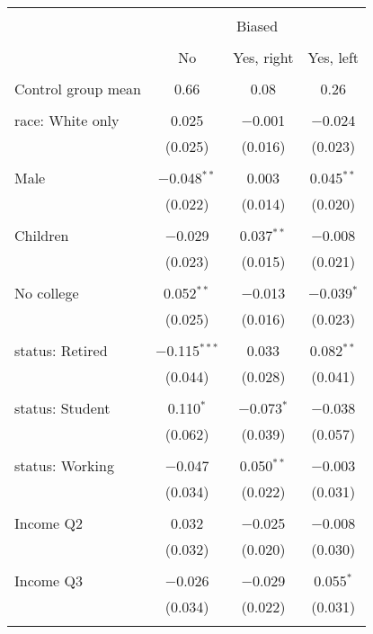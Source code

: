 
\begin{tabular}{@{\extracolsep{5pt}}lccc} 
\\[-1.8ex]\hline 
\hline \\[-1.8ex] 
 & \multicolumn{3}{c}{Biased} \\ 
\cline{2-4} 
\\[-1.8ex] & No & Yes, right & Yes, left \\ 
\hline \\[-1.8ex] 
 Control group mean & 0.66 & 0.08 & 0.26  \\ \hline \\[-1.8ex] race: White only & 0.025 & $-$0.001 & $-$0.024 \\ 
  & (0.025) & (0.016) & (0.023) \\ 
  & & & \\ 
 Male & $-$0.048$^{**}$ & 0.003 & 0.045$^{**}$ \\ 
  & (0.022) & (0.014) & (0.020) \\ 
  & & & \\ 
 Children & $-$0.029 & 0.037$^{**}$ & $-$0.008 \\ 
  & (0.023) & (0.015) & (0.021) \\ 
  & & & \\ 
 No college & 0.052$^{**}$ & $-$0.013 & $-$0.039$^{*}$ \\ 
  & (0.025) & (0.016) & (0.023) \\ 
  & & & \\ 
 status: Retired & $-$0.115$^{***}$ & 0.033 & 0.082$^{**}$ \\ 
  & (0.044) & (0.028) & (0.041) \\ 
  & & & \\ 
 status: Student & 0.110$^{*}$ & $-$0.073$^{*}$ & $-$0.038 \\ 
  & (0.062) & (0.039) & (0.057) \\ 
  & & & \\ 
 status: Working & $-$0.047 & 0.050$^{**}$ & $-$0.003 \\ 
  & (0.034) & (0.022) & (0.031) \\ 
  & & & \\ 
 Income Q2 & 0.032 & $-$0.025 & $-$0.008 \\ 
  & (0.032) & (0.020) & (0.030) \\ 
  & & & \\ 
 Income Q3 & $-$0.026 & $-$0.029 & 0.055$^{*}$ \\ 
  & (0.034) & (0.022) & (0.031) \\ 
  & & & \\ 

\end{tabular}
